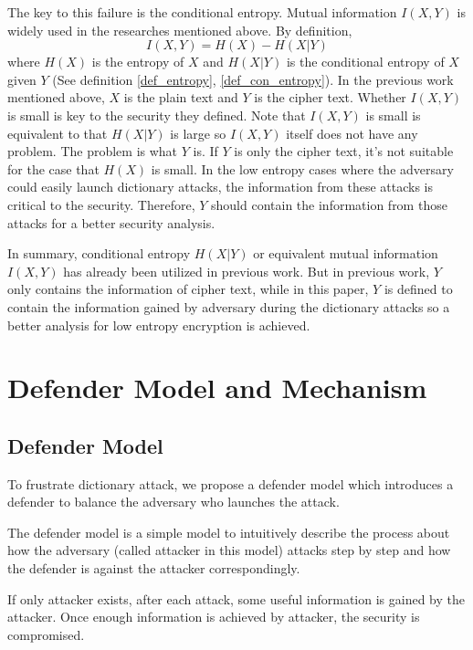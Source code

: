 \documentclass[10pt, conference, compsocconf]{IEEEtran}
\begin{document}
    The key to this failure is the conditional entropy. Mutual information
    $I(X, Y)$ is widely used in the researches mentioned above. By definition,
    \begin{equation}
        I(X, Y) = H(X) - H(X|Y)
    \end{equation}
    where $H(X)$ is the entropy of $X$ and $H(X|Y)$ is the conditional entropy
    of $X$ given $Y$ (See definition \ref{def_entropy}, \ref{def_con_entropy}).
    In the previous work mentioned above, $X$ is the plain text and $Y$ is the cipher text.
    Whether $I(X, Y)$ is small is key to the security they defined.
    Note that $I(X, Y)$ is small
    is equivalent to that $H(X|Y)$ is large so $I(X, Y)$ itself does not have any problem.
    The problem is what $Y$ is.
    If $Y$ is only the cipher text, it's not suitable for the case that $H(X)$ is small.
    In the low entropy cases where the adversary could easily launch dictionary attacks,
    the information from these attacks is critical to the security. Therefore, $Y$
    should contain the information from those attacks for a better security analysis.

    In summary, conditional entropy $H(X|Y)$ or equivalent mutual information $I(X, Y)$
    has already been utilized in previous work. But in previous work, $Y$ only
    contains the information of cipher text, while in this paper, $Y$ is defined to contain the information
    gained by adversary during the dictionary attacks so a better analysis
    for low entropy encryption is achieved.

\section{Defender Model and Mechanism}\label{sec_def}
    \subsection{Defender Model}
    	To frustrate dictionary attack, we propose a 
		defender model which introduces
		a defender to balance the adversary who launches the attack.
    
        The defender model is a simple model
        to intuitively describe the process about how the adversary
        (called attacker in this model) attacks step by step
        and how the defender is against the attacker correspondingly.
		
		If only attacker exists,
		after each attack, some useful information is gained by the attacker.
        Once enough information is achieved by attacker,
        the security is compromised.
\end{document}
